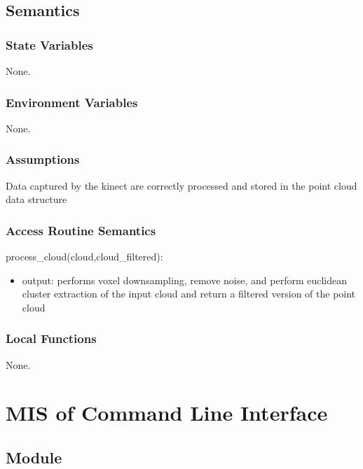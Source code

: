 \documentclass[12pt, titlepage]{article}
\begin{document}
\subsection{Semantics}

\subsubsection{State Variables}

None.

\subsubsection{Environment Variables}

None.

\subsubsection{Assumptions}

Data captured by the kinect are correctly processed and stored in the point cloud data structure

\subsubsection{Access Routine Semantics}

\noindent process\_cloud(cloud,cloud\_filtered):
\begin{itemize}
\item output: performs voxel downsampling, remove noise, and perform euclidean cluster extraction of the input cloud and return a filtered version of the point cloud 
\end{itemize}


\subsubsection{Local Functions}

None.

\newpage

\section{MIS of Command Line Interface} \label{ModuleCLI} 

\subsection{Module}
\end{document}
